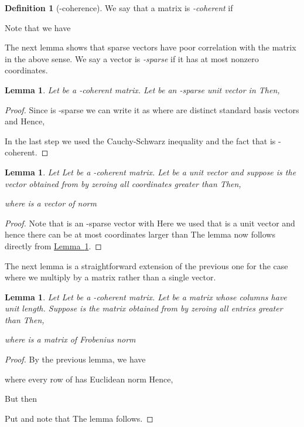 \documentclass[letterpaper,11pt]{article}
\newtheorem{lemma}[theorem]{Lemma}
\theoremstyle{definition}
\newtheorem{definition}[theorem]{Definition}
\newcommand{\definitionlabel}[1]{\label{def:#1}}
\newcommand{\lemmalabel}[1]{\label{lem:#1}}
\newcommand{\lemmaref}[1]{\hyperref[lem:#1]{Lemma~\ref{lem:#1}}}
\begin{document}
\begin{definition}[-coherence]
\definitionlabel{C-coherence}
We say that a matrix  is \emph{-coherent} if

Note that we have 
\end{definition}

The next lemma shows that sparse vectors have poor correlation with the matrix
in the above sense. We say a vector  is \emph{-sparse} if it has at
most  nonzero coordinates.

\begin{lemma}
\lemmalabel{sparse-vector}
Let  be a -coherent matrix.
Let  be an -sparse unit vector in 
Then,

\end{lemma}

\begin{proof}
Since  is -sparse we can write it as 
where  are  distinct standard basis vectors
and 
Hence,

In the last step we used the Cauchy-Schwarz inequality and the fact that  is
-coherent.
\end{proof}

\begin{lemma}
Let 
Let  be a -coherent matrix.
Let  be a unit vector and suppose  is the vector obtained
from  by zeroing all coordinates greater than  Then,

where  is a vector of norm

\end{lemma}

\begin{proof}
Note that  is an -sparse vector with 
Here we used that  is a unit vector and hence there can be at most
 coordinates larger than  The lemma now follows directly
from \lemmaref{sparse-vector}.
\end{proof}

The next lemma is a straightforward extension of the previous one for the case
where we multiply  by a matrix  rather than a single vector.
\begin{lemma}\lemmalabel{truncation-error}
Let 
Let  be a -coherent matrix.
Let  be a matrix whose columns have unit length.
Suppose  is the matrix obtained
from  by zeroing all entries greater than  Then,

where  is a matrix of Frobenius norm

\end{lemma}
\begin{proof}
By the previous lemma,
we have

where every row of  has Euclidean norm
  Hence,

But then

Put  and note that  The
lemma follows.
\end{proof}
\end{document}
